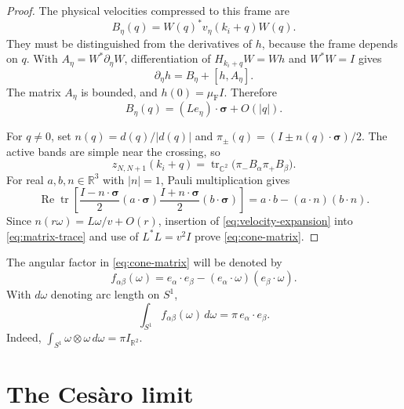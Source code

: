 \documentclass[11pt,a4paper]{article}
\newcommand{\R}{\mathbb R}
\newcommand{\C}{\mathbb C}
\DeclareMathOperator{\tr}{tr}
\DeclareMathOperator{\Ree}{Re}
\numberwithin{equation}{section}
\begin{document}
\begin{proof}
The physical velocities compressed to this frame are
\[
 B_\eta(q)=W(q)^*v_\eta(k_i+q)W(q).
\]
They must be distinguished from the derivatives of $h$, because the
frame depends on $q$. With $A_\eta=W^*\partial_\eta W$, differentiation
of $H_{k_i+q}W=Wh$ and $W^*W=I$ gives
\begin{equation}\label{eq:connection}
 \partial_\eta h=B_\eta+[h,A_\eta].
\end{equation}
The matrix $A_\eta$ is bounded, and $h(0)=\mu_{\mathrm F}I$. Therefore
\begin{equation}\label{eq:velocity-expansion}
 B_\eta(q)=(Le_\eta)\cdot\boldsymbol\sigma+O(|q|).
\end{equation}

For $q\ne0$, set $n(q)=d(q)/|d(q)|$ and
$\pi_\pm(q)=(I\pm n(q)\cdot\boldsymbol\sigma)/2$. The active bands
are simple near the crossing, so
\begin{equation}\label{eq:matrix-trace}
 z_{N,N+1}(k_i+q)
 =\tr_{\C^2}\bigl(\pi_- B_\alpha\pi_+B_\beta\bigr).
\end{equation}
For real $a,b,n\in\R^3$ with $|n|=1$, Pauli multiplication gives
\begin{equation}\label{eq:pauli-identity}
 \Ree\tr\!\left[
 \frac{I-n\cdot\boldsymbol\sigma}{2}
 (a\cdot\boldsymbol\sigma)
 \frac{I+n\cdot\boldsymbol\sigma}{2}
 (b\cdot\boldsymbol\sigma)\right]
 =a\cdot b-(a\cdot n)(b\cdot n).
\end{equation}
Since $n(r\omega)=L\omega/v+O(r)$, insertion of
\eqref{eq:velocity-expansion} into \eqref{eq:matrix-trace} and use of
$L^*L=v^2I$ prove \eqref{eq:cone-matrix}.
\end{proof}

The angular factor in \eqref{eq:cone-matrix} will be denoted by
\begin{equation}\label{eq:angular-factor}
 f_{\alpha\beta}(\omega)
 =e_\alpha\cdot e_\beta
 -(e_\alpha\cdot\omega)(e_\beta\cdot\omega).
\end{equation}
With $d\omega$ denoting arc length on $S^1$,
\begin{equation}\label{eq:angular-integral}
 \int_{S^1}f_{\alpha\beta}(\omega)\,d\omega
 =\pi\,e_\alpha\cdot e_\beta.
\end{equation}
Indeed, $\int_{S^1}\omega\otimes\omega\,d\omega=\pi I_{\R^2}$.

\section{The Ces\`aro limit}\label{sec:limit}
\end{document}
